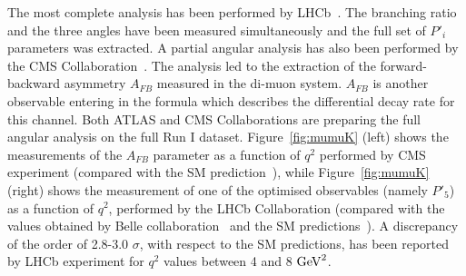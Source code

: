 The most complete analysis has been performed by LHCb~\cite{mumuK_LHCb}. The branching ratio and the three angles have been measured simultaneously and the full set of $P'_i$ parameters was extracted. A partial angular analysis has also been performed by the CMS Collaboration~\cite{mumuK_CMS}. The analysis led to the extraction of the forward-backward asymmetry $A_{FB}$  measured in the di-muon system. $A_{FB}$ is another observable entering in the formula which describes the differential decay rate for this channel. Both ATLAS and CMS Collaborations are preparing the full angular analysis on the full Run I dataset.  Figure~\ref{fig:mumuK} (left) shows the measurements of the $A_{FB}$ parameter as a function of $q^2$ performed by CMS experiment (compared with the SM prediction~\cite{ABSZ}), while Figure~\ref{fig:mumuK} (right) shows the measurement of one of the optimised observables (namely $P'_5$) as a function of $q^2$,  performed by the LHCb Collaboration (compared with the values obtained by Belle collaboration~\cite{Belle} and the SM predictions~\cite{DHMV}). A discrepancy of the order of 2.8-3.0 $\sigma$, with respect to the SM predictions, has been reported by LHCb experiment for $q^2$ values between 4 and 8 ${\rm{GeV}}^2$.

